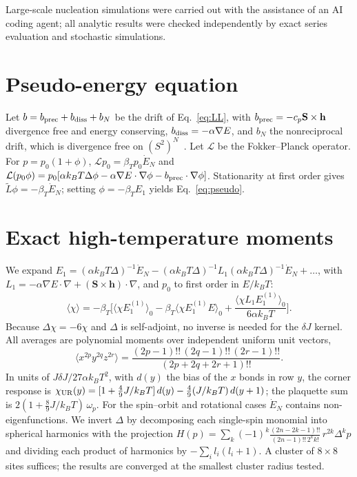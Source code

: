 \documentclass[aps,prb,twocolumn,superscriptaddress,longbibliography,floatfix]{revtex4-2}
\newcommand{\vS}{\mathbf S}
\newcommand{\vh}{\mathbf h}
\newcommand{\kT}{k_BT}
\newcommand{\avg}[1]{\langle #1\rangle}
\begin{document}
\begin{acknowledgments}
Large-scale nucleation simulations were carried out with the assistance of an AI coding agent; all analytic results were checked independently by exact series evaluation and stochastic simulations.
\end{acknowledgments}

\appendix

\section{Pseudo-energy equation}\label{app:pseudo}

Let $b=b_{\rm prec}+b_{\rm diss}+b_N$ be the drift of Eq.~\eqref{eq:LL}, with $b_{\rm prec}=-c_p\vS\times\vh$ divergence free and energy conserving, $b_{\rm diss}=-\alpha\nabla E$, and $b_N$ the nonreciprocal drift, which is divergence free on $(S^2)^N$~\cite{Companion}. Let $\mathcal L$ be the Fokker--Planck operator. For $p=p_0(1+\phi)$, $\mathcal Lp_0=\beta_Tp_0\dot E_N$ and $\mathcal L(p_0\phi)=p_0[\alpha\kT\Delta\phi-\alpha\nabla E\cdot\nabla\phi-b_{\rm prec}\cdot\nabla\phi]$. Stationarity at first order gives $\tilde L\phi=-\beta_T\dot E_N$; setting $\phi=-\beta_TE_1$ yields Eq.~\eqref{eq:pseudo}.

\section{Exact high-temperature moments}\label{app:moments}

We expand $E_1=(\alpha\kT\Delta)^{-1}\dot E_N-(\alpha\kT\Delta)^{-1}L_1(\alpha\kT\Delta)^{-1}\dot E_N+\dots$, with $L_1=-\alpha\nabla E\cdot\nabla+(\vS\times\vh)\cdot\nabla$, and $p_0$ to first order in $E/\kT$:
\begin{equation}
\avg{\chi}=-\beta_T\Big[\avg{\chi E_1^{(1)}}_0-\beta_T\avg{\chi E_1^{(1)}E}_0+\frac{\avg{\chi L_1E_1^{(1)}}_0}{6\alpha\kT}\Big].
\end{equation}
Because $\Delta\chi=-6\chi$ and $\Delta$ is self-adjoint, no inverse is needed for the $\delta J$ kernel. All averages are polynomial moments over independent uniform unit vectors,
\begin{equation}
\avg{x^{2p}y^{2q}z^{2r}}=\frac{(2p-1)!!\,(2q-1)!!\,(2r-1)!!}{(2p+2q+2r+1)!!}.
\end{equation}
In units of $J\delta J/27\alpha\kT^2$, with $d(y)$ the bias of the $x$ bonds in row $y$, the corner response is $\chi_{\rm UR}(y)=[1+\tfrac49J/\kT]\,d(y)-\tfrac49(J/\kT)\,d(y+1)$; the plaquette sum is $2(1+\tfrac89J/\kT)\,\omega_p$. For the spin--orbit and rotational cases $\dot E_N$ contains non-eigenfunctions. We invert $\Delta$ by decomposing each single-spin monomial into spherical harmonics with the projection $H(p)=\sum_k(-1)^k\frac{(2n-2k-1)!!}{(2n-1)!!\,2^kk!}\,r^{2k}\Delta^kp$ and dividing each product of harmonics by $-\sum_il_i(l_i+1)$. A cluster of $8\times8$ sites suffices; the results are converged at the smallest cluster radius tested.
\end{document}
